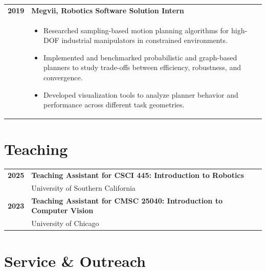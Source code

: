 \documentclass[12pt, letterpaper]{article}
\newlength{\datecolwidth}
\begin{document}
\begin{tabularx}{\textwidth}{@{}p{\datecolwidth} X@{}}
    \textbf{2019} & \textbf{Megvii, Robotics Software Solution Intern} \\
    & \begin{itemize}[leftmargin=*, nosep, after=\vspace{4pt}]
        \item Researched sampling-based motion planning algorithms for high-DOF industrial manipulators in constrained environments.
        \item Implemented and benchmarked probabilistic and graph-based planners to study trade-offs between efficiency, robustness, and convergence.
        \item Developed visualization tools to analyze planner behavior and performance across different task geometries.
    \end{itemize}
\end{tabularx}

\section*{Teaching}

\noindent
\begin{tabularx}{\textwidth}{@{}p{\datecolwidth} X@{}}
    \textbf{2025} & \textbf{Teaching Assistant for CSCI 445: Introduction to Robotics} \\
    & University of Southern California \\ [4pt]

    \textbf{2023} & \textbf{Teaching Assistant for CMSC 25040: Introduction to Computer Vision} \\
    & University of Chicago \\
\end{tabularx}

\section*{Service \& Outreach}
\end{document}
